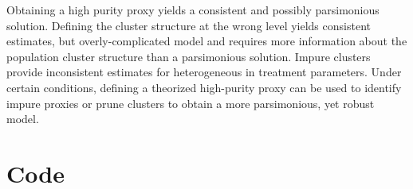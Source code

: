 \documentclass{jbsc}
\begin{document}
Obtaining a high purity proxy yields a consistent and possibly parsimonious solution. Defining the cluster structure at the wrong level yields consistent estimates, but overly-complicated model and requires more information about the population cluster structure than a parsimonious solution. Impure clusters provide inconsistent estimates for heterogeneous in treatment parameters. Under certain conditions, defining a theorized high-purity proxy can be used to identify impure proxies or prune clusters to obtain a more parsimonious, yet robust model.

\singlespacing
\printbibliography

\appendix

\section{Code}
\end{document}
